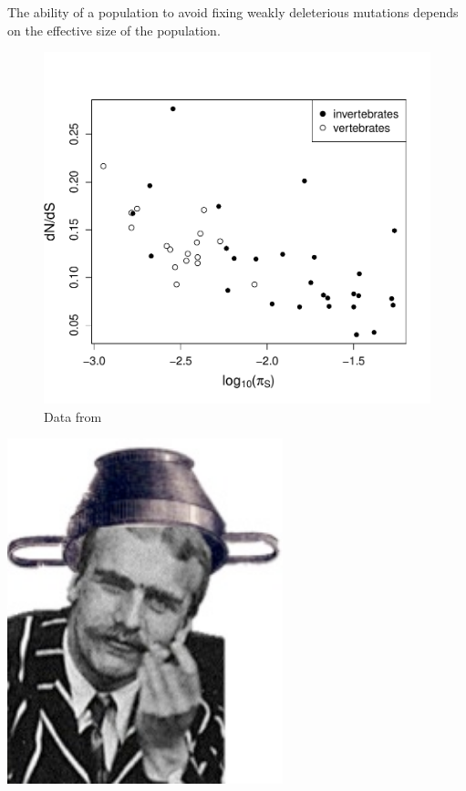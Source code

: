 
The ability of a population to avoid fixing weakly deleterious
mutations depends on the effective size of the population. 

\begin{figure}
\begin{center}
\includegraphics[width=\textwidth]{Journal_figs/drift_selection/Galtier_dNdS/Galtier_dNdS.pdf}
\end{center}
\caption{Data from \citet{galtier2016adaptive} } \label{Galtier_dNdS}
\end{figure}


\begin{marginfigure}
  \begin{center}
    \includegraphics[width=0.6\textwidth]{figures/haldanes_sieve.png}
\end{center}
\caption{} \label{fig:haldanes_sieve}
\end{marginfigure}

